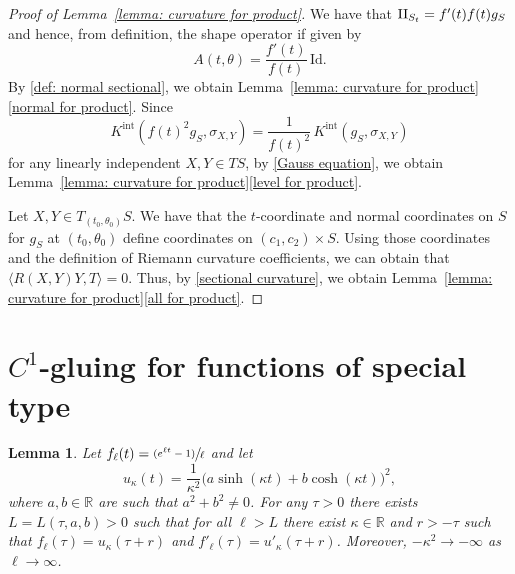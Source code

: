\documentclass[10pt]{amsart}
\newcommand{\psfrac}[2]{\sfrac{(#1)}{#2}}
\newcommand{\Int}{\mathrm{int}}
\newtheorem{lemma}[theorem]{Lemma}
\theoremstyle{definition}
\newcommand{\RomanNumeralCaps}[1]
{\MakeUppercase{\romannumeral #1}}
\newcommand{\II}{\textup{\RomanNumeralCaps{2}}}
\renewcommand{\>}{{\rangle}}
\newcommand{\<}{{\langle}}
\begin{document}
\begin{proof}[Proof of Lemma~\ref{lemma: curvature for product}]
We have that $\II_{S_t} = f'(t)f(t)g_S$ and hence, from definition, the shape operator if given by\vspace*{-3pt}
\[
A(t,\theta) = \frac{f'(t)}{f(t)}\,\text{Id}.
\]
By \eqref{def: normal sectional}, we obtain Lemma~\ref{lemma: curvature for product}\eqref{normal for product}. Since\vspace*{-3pt}
\[
K^{\Int}(f(t)^2g_S,\sigma_{X,Y}) = \frac{1}{f(t)^2}\,K^{\Int}(g_S,\sigma_{X,Y})
\]
for any linearly independent $X,Y\in TS$, by \eqref{Gauss equation}, we obtain Lemma~\ref{lemma: curvature for product}\eqref{level for product}.

Let $X,Y\in T_{(t_0,\theta_0)}S$. We have that the $t$-coordinate and normal coordinates on $S$ for $g_S$ at $(t_0,\theta_0)$ define coordinates on $(c_1,c_2)\times S$. Using those coordinates and the definition of Riemann curvature coefficients, we can obtain that $\langle R(X,Y)Y,T\rangle=0$. Thus, by \eqref{sectional curvature}, we obtain Lemma~\ref{lemma: curvature for product}\eqref{all for product}.
\end{proof}

\section{\texorpdfstring{$C^1$}{C}-gluing for functions of special type}\label{app: combine f with construction 2}

\begin{lemma}\label{lemma: combine f with constant 2}
Let $f_\ell(t) = \psfrac{e^{\ell t}-1}{\ell}$ and let\vspace*{-3pt}
\[
u_\kappa(t)=\frac{1}{\kappa^2}\bigl(a\sinh(\kappa t)+b\cosh(\kappa t)\bigr)^2,
\]
where $a,b\in\mathbb R$ are such that $a^2+b^2\neq 0$. For any $\tau>0$ there exists $L=L(\tau,a,b)>0$ such that for all $\ell>L$ there exist $\kappa\in\mathbb R$ and $r>-\tau$ such that $f_\ell(\tau)=u_\kappa(\tau+r)$ and $f'_\ell(\tau) = u'_\kappa(\tau+r)$. Moreover, $-\kappa^2\to-\infty$ as $\ell\to\infty$.
\end{lemma}
\end{document}
